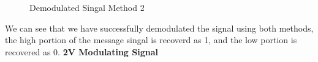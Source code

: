 \documentclass[12pt]{article}
\begin{document}
\begin{figure}[H]
    \centering
    \caption{Demodulated Singal Method 2}
\end{figure}
We can see that we have successfully demodulated the signal using both methods, the high portion of the message singal is recoverd as 1, and the low portion is recovered as 0.
\textbf{2V Modulating Signal}
\end{document}
